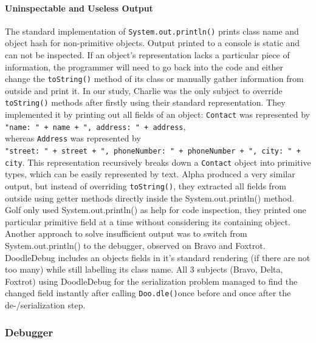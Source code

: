 \documentclass[english]{acm_proc_article-sp}
\begin{document}
\paragraph{Uninspectable and Useless Output}
The standard implementation of \texttt{System.out.println()} prints class name and object hash for non-primitive objects. 
Output printed to a console is static and can not be inspected. 
If an object's representation lacks a particular piece of information, the programmer will need to go back into the code and either change the \texttt{toString()} method of its class or manually gather information from outside and print it. 
In our study, Charlie was the only subject to override \texttt{toString()} methods after firstly using their standard representation. 
They implemented it by printing out all fields of an object: \texttt{Contact} 
was represented by\\
\texttt{"name: " + name + ", address: " + address},\\
whereas \texttt{Address}
was represented by\\
\texttt{"street: " + street + ", phoneNumber: " + phoneNumber + ", city: " + city}.
This representation recursively breaks down a \texttt{Contact} 
object into primitive types, which can be easily represented by text. 
Alpha produced a very similar output, but instead of overriding \texttt{toString()}, they extracted all fields from outside using getter methods directly inside the System.out.println() method. 
Golf only used System.out.println() as help for code inspection, they printed one particular primitive field at a time without considering its containing object.\\
Another approach to solve insufficient output was to switch from System.out.println() to the debugger, observed on Bravo and Foxtrot.\\
DoodleDebug includes an objects fields in it's standard rendering (if there are not too many) while still labelling its class name. 
All 3 subjects (Bravo, Delta, Foxtrot) using DoodleDebug for the serialization problem managed to find the changed field instantly after calling \texttt{Doo.dle()}once before and once after the de-/serialization step.

\subsubsection{Debugger}
\end{document}
